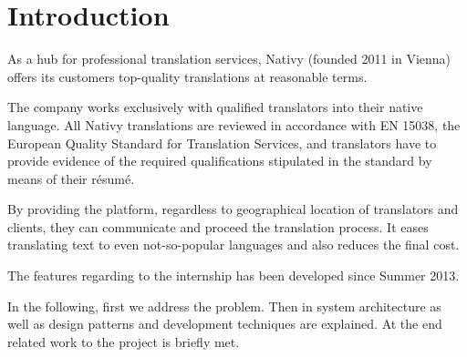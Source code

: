 \section{Introduction}
As a hub for professional translation services, Nativy \cite{nativy}(founded 2011 in Vienna) offers its customers top-quality translations at reasonable terms. 

The company works exclusively with qualified translators into their native language. All Nativy translations are reviewed in accordance with EN 15038, the European Quality Standard for Translation Services, and translators have to provide evidence of the required qualifications stipulated in the standard by means of their résumé.

By providing the platform, regardless to geographical location of translators and clients, they can communicate and proceed the translation process. It eases translating text to even not-so-popular languages and also reduces the final cost.

The features regarding to the internship has been developed since Summer 2013.

In the following, first we address the problem. Then in system architecture as well as design patterns and development techniques are explained. At the end related work to the project is briefly met.